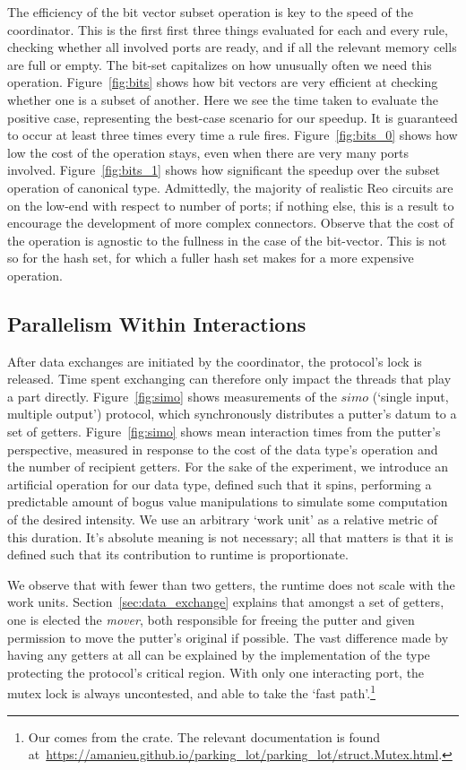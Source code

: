 The efficiency of the bit vector subset operation is key to the speed of the coordinator. This is the first first three things evaluated for each and every rule, checking whether all involved ports are ready, and if all the relevant memory cells are full or empty. The bit-set capitalizes on how unusually often we need this operation. Figure~\ref{fig:bits} shows how bit vectors are very efficient at checking whether one is a subset of another. Here we see the time taken to evaluate the positive case, representing the best-case scenario for our speedup. It is guaranteed to occur at least three times every time a rule fires. Figure~\ref{fig:bits_0} shows how low the cost of the operation stays, even when there are very many ports involved. Figure~\ref{fig:bits_1} shows how significant the speedup over the subset operation of canonical  type. Admittedly, the majority of realistic Reo circuits are on the low-end with respect to number of ports; if nothing else, this is a result to encourage the development of more complex connectors. Observe that the cost of the operation is agnostic to the fullness in the case of the bit-vector. This is not so for the hash set, for which a fuller hash set makes for a more expensive operation. 



\subsection{Parallelism Within Interactions}
After data exchanges are initiated by the coordinator, the protocol's lock is released. Time spent exchanging can therefore only impact the threads that play a part directly. Figure~\ref{fig:simo} shows measurements of the $simo$ (`single input, multiple output') protocol, which synchronously distributes a putter's datum to a set of getters. Figure~\ref{fig:simo} shows mean interaction times from the putter's perspective, measured in response to the cost of the data type's  operation and the number of recipient getters. For the sake of the experiment, we introduce an artificial  operation for our data type, defined such that it spins, performing a predictable amount of bogus value manipulations to simulate some computation of the desired intensity. We use an arbitrary `work unit' as a relative metric of this duration. It's absolute meaning is not necessary; all that matters is that it is defined such that its contribution to runtime is proportionate.

We observe that with fewer than two getters, the runtime does not scale with the work units. Section~\ref{sec:data_exchange} explains that amongst a set of getters, one is elected the \textit{mover}, both responsible for freeing the putter and given permission to move the putter's original if possible. The vast difference made by having any getters at all can be explained by the implementation of the  type protecting the protocol's critical region. With only one interacting port, the mutex lock is always uncontested, and able to take the `fast path'.\footnote{Our  comes from the  crate. The relevant documentation is found at~\url{https://amanieu.github.io/parking_lot/parking_lot/struct.Mutex.html}.}

